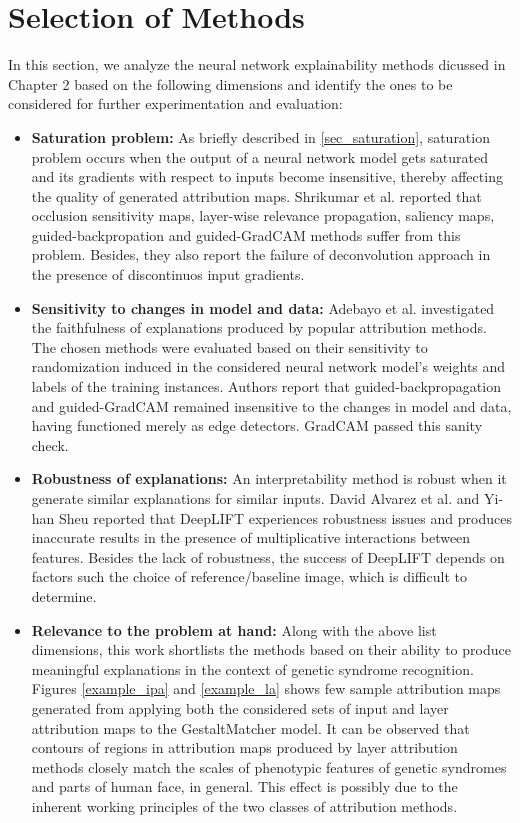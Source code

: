 \documentclass[../report.tex]{subfiles}
\begin{document}
    \section{Selection of Methods}
    In this section, we analyze the neural network explainability methods dicussed in Chapter 2 based on the following dimensions and identify the ones to be considered for further experimentation and evaluation:
    \begin{itemize}
    	\item \textbf{Saturation problem:} As briefly described in \ref{sec_saturation}, saturation problem occurs when the output of a neural network model gets saturated and its gradients with respect to inputs become insensitive, thereby affecting the quality of generated attribution maps. Shrikumar et al. \cite{shrikumar2017learning} reported that occlusion sensitivity maps, layer-wise relevance propagation, saliency maps, guided-backpropation and guided-GradCAM methods suffer from this problem. Besides, they also report the failure of deconvolution approach in the presence of discontinuos input gradients.   
    	\item \textbf{Sensitivity to changes in model and data:} Adebayo et al. \cite{adebayo2018sanity} investigated the faithfulness of explanations produced by popular attribution methods. The chosen methods were evaluated based on their sensitivity to randomization induced in the considered neural network model's weights and labels of the training instances. Authors report that guided-backpropagation and guided-GradCAM remained insensitive to the changes in model and data, having functioned merely as edge detectors. GradCAM passed this sanity check.
    	\item \textbf{Robustness of explanations:} An interpretability method is robust when it generate similar explanations for similar inputs. David Alvarez et al. \cite{alvarez2018robustness} and Yi-han Sheu \cite{sheu2020illuminating} reported that DeepLIFT experiences robustness issues and produces inaccurate results in the presence of multiplicative interactions between features. Besides the lack of robustness, the success of DeepLIFT depends on factors such the choice of reference/baseline image, which is difficult to determine. 
    	\item \textbf{Relevance to the problem at hand:} Along with the above list dimensions, this work shortlists the methods based on their ability to produce meaningful explanations in the context of genetic syndrome recognition. Figures \ref{example_ipa} and \ref{example_la}  shows few sample attribution maps generated from applying both the considered sets of input and layer attribution maps to the GestaltMatcher model. It can be observed that contours of regions in attribution maps produced by layer attribution methods closely match the scales of phenotypic features of genetic syndromes and parts of human face, in general. This effect is possibly due to the inherent working principles of the two classes of attribution methods.\\

\end{itemize}
\end{document}
